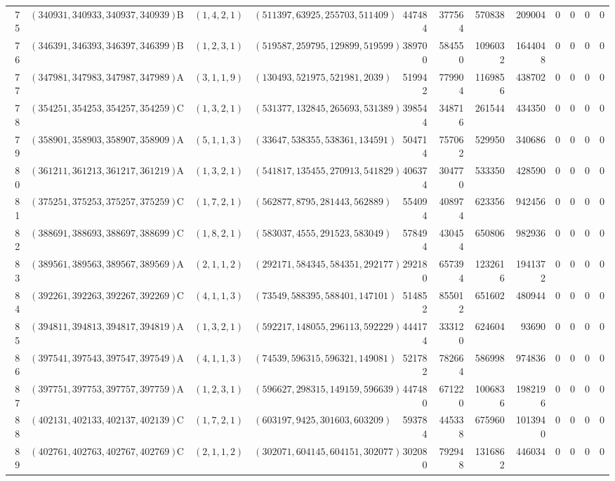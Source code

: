 \begin{longtable}{r l c l l r r r r c c c c}
75 & $(340931,340933,340937,340939)$ & B & $(1,4,2,1)$ & $(511397,63925,255703,511409)$ & 447484 & 377564 & 570838 & 209004 & 0 & 0 & 0 & 0\\
76 & $(346391,346393,346397,346399)$ & B & $(1,2,3,1)$ & $(519587,259795,129899,519599)$ & 389700 & 584550 & 1096032 & 1644048 & 0 & 0 & 0 & 0\\
77 & $(347981,347983,347987,347989)$ & A & $(3,1,1,9)$ & $(130493,521975,521981,2039)$ & 519942 & 779904 & 1169856 & 438702 & 0 & 0 & 0 & 0\\
78 & $(354251,354253,354257,354259)$ & C & $(1,3,2,1)$ & $(531377,132845,265693,531389)$ & 398544 & 348716 & 261544 & 434350 & 0 & 0 & 0 & 0\\
79 & $(358901,358903,358907,358909)$ & A & $(5,1,1,3)$ & $(33647,538355,538361,134591)$ & 504714 & 757062 & 529950 & 340686 & 0 & 0 & 0 & 0\\
80 & $(361211,361213,361217,361219)$ & A & $(1,3,2,1)$ & $(541817,135455,270913,541829)$ & 406374 & 304770 & 533350 & 428590 & 0 & 0 & 0 & 0\\
81 & $(375251,375253,375257,375259)$ & C & $(1,7,2,1)$ & $(562877,8795,281443,562889)$ & 554094 & 408974 & 623356 & 942456 & 0 & 0 & 0 & 0\\
82 & $(388691,388693,388697,388699)$ & C & $(1,8,2,1)$ & $(583037,4555,291523,583049)$ & 578494 & 430454 & 650806 & 982936 & 0 & 0 & 0 & 0\\
83 & $(389561,389563,389567,389569)$ & A & $(2,1,1,2)$ & $(292171,584345,584351,292177)$ & 292180 & 657394 & 1232616 & 1941372 & 0 & 0 & 0 & 0\\
84 & $(392261,392263,392267,392269)$ & C & $(4,1,1,3)$ & $(73549,588395,588401,147101)$ & 514852 & 855012 & 651602 & 480944 & 0 & 0 & 0 & 0\\
85 & $(394811,394813,394817,394819)$ & A & $(1,3,2,1)$ & $(592217,148055,296113,592229)$ & 444174 & 333120 & 624604 & 93690 & 0 & 0 & 0 & 0\\
86 & $(397541,397543,397547,397549)$ & A & $(4,1,1,3)$ & $(74539,596315,596321,149081)$ & 521782 & 782664 & 586998 & 974836 & 0 & 0 & 0 & 0\\
87 & $(397751,397753,397757,397759)$ & A & $(1,2,3,1)$ & $(596627,298315,149159,596639)$ & 447480 & 671220 & 1006836 & 1982196 & 0 & 0 & 0 & 0\\
88 & $(402131,402133,402137,402139)$ & C & $(1,7,2,1)$ & $(603197,9425,301603,603209)$ & 593784 & 445338 & 675960 & 1013940 & 0 & 0 & 0 & 0\\
89 & $(402761,402763,402767,402769)$ & C & $(2,1,1,2)$ & $(302071,604145,604151,302077)$ & 302080 & 792948 & 1316862 & 446034 & 0 & 0 & 0 & 0\\

\end{longtable}
